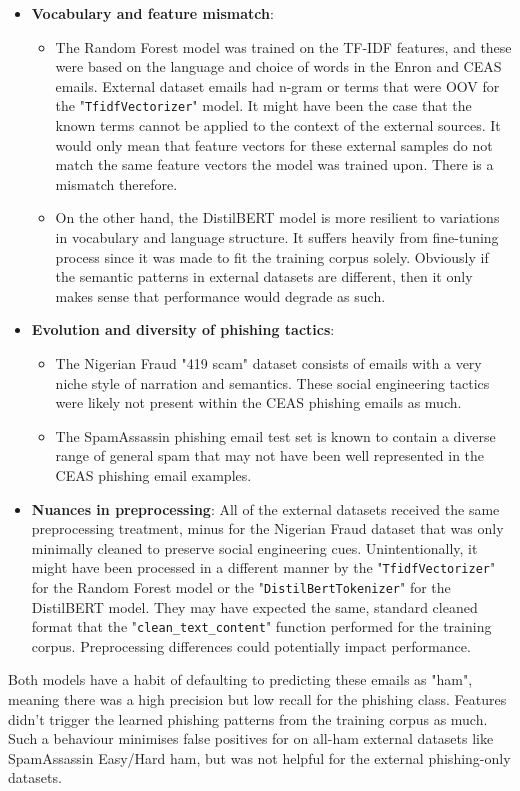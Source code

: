 \begin{itemize}
  \item \textbf{Vocabulary and feature mismatch}:
  \begin{itemize}
    \item The Random Forest model was trained on the TF-IDF features, and these were based on the language and choice of words in the Enron and CEAS emails. External dataset emails had n-gram or terms that were OOV for the "\texttt{TfidfVectorizer}" model. It might have been the case that the known terms cannot be applied to the context of the external sources. It would only mean that feature vectors for these external samples do not match the same feature vectors the model was trained upon. There is a mismatch therefore.
    \item On the other hand, the DistilBERT model is more resilient to variations in vocabulary and language structure. It suffers heavily from fine-tuning process since it was made to fit the training corpus solely. Obviously if the semantic patterns in external datasets are different, then it only makes sense that performance would degrade as such.
  \end{itemize}
  \item \textbf{Evolution and diversity of phishing tactics}:
  \begin{itemize}
    \item The Nigerian Fraud "419 scam" dataset consists of emails with a very niche style of narration and semantics. These social engineering tactics were likely not present within the CEAS phishing emails as much.
    \item The SpamAssassin phishing email test set is known to contain a diverse range of general spam that may not have been well represented in the CEAS phishing email examples.
  \end{itemize}
  \item \textbf{Nuances in preprocessing}: All of the external datasets received the same preprocessing treatment, minus for the Nigerian Fraud dataset that was only minimally cleaned to preserve social engineering cues. Unintentionally, it might have been processed in a different manner by the "\texttt{TfidfVectorizer}" for the Random Forest model or the "\texttt{DistilBertTokenizer}" for the DistilBERT model. They may have expected the same, standard cleaned format  that the "\texttt{clean\_text\_content}" function performed for the training corpus. Preprocessing differences could potentially impact performance.
\end{itemize}

\noindent Both models have a habit of defaulting to predicting these emails as "ham", meaning there was a high precision but low recall for the phishing class. Features didn't trigger the learned phishing patterns from the training corpus as much. Such a behaviour minimises false positives for on all-ham external datasets like SpamAssassin Easy/Hard ham, but was not helpful for the external phishing-only datasets.
